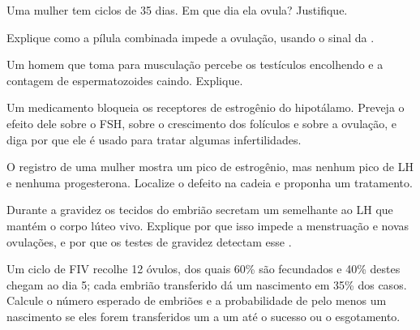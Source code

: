 \begin{exercise}[$\star\star$]\label{exo:g11:hormones-and-reproduction:9}
Uma mulher tem ciclos de 35 dias. Em que dia ela ovula? Justifique.
\end{exercise}

\begin{exercise}[$\star\star$]\label{exo:g11:hormones-and-reproduction:10}
Explique como a pílula combinada impede a ovulação, usando o sinal da
.
\end{exercise}

\begin{exercise}[$\star\star$]\label{exo:g11:hormones-and-reproduction:11}
Um homem que toma  para musculação percebe os testículos
encolhendo e a contagem de espermatozoides caindo. Explique.
\end{exercise}

\begin{exercise}[$\star\star\star$]\label{exo:g11:hormones-and-reproduction:12}
Um medicamento bloqueia os receptores de estrogênio do hipotálamo.
Preveja o efeito dele sobre o FSH, sobre o crescimento dos folículos e
sobre a ovulação, e diga por que ele é usado para tratar algumas
infertilidades.
\end{exercise}

\begin{exercise}[$\star\star\star$]\label{exo:g11:hormones-and-reproduction:13}
O registro de uma mulher mostra um pico de estrogênio, mas nenhum pico
de LH e nenhuma progesterona. Localize o defeito na cadeia e proponha
um tratamento.
\end{exercise}

\begin{exercise}[$\star\star\star$]\label{exo:g11:hormones-and-reproduction:14}
Durante a gravidez os tecidos do embrião secretam um 
semelhante ao LH que mantém o corpo lúteo vivo. Explique por que isso
impede a menstruação e novas ovulações, e por que os testes de gravidez
detectam esse .
\end{exercise}

\begin{exercise}[$\star\star\star$]\label{exo:g11:hormones-and-reproduction:15}
Um ciclo de FIV recolhe 12 óvulos, dos quais 60\% são fecundados e 40\%
destes chegam ao dia 5; cada embrião transferido dá um nascimento em
35\% dos casos. Calcule o número esperado de embriões e a probabilidade
de pelo menos um nascimento se eles forem transferidos um a um até o
sucesso ou o esgotamento.
\end{exercise}

